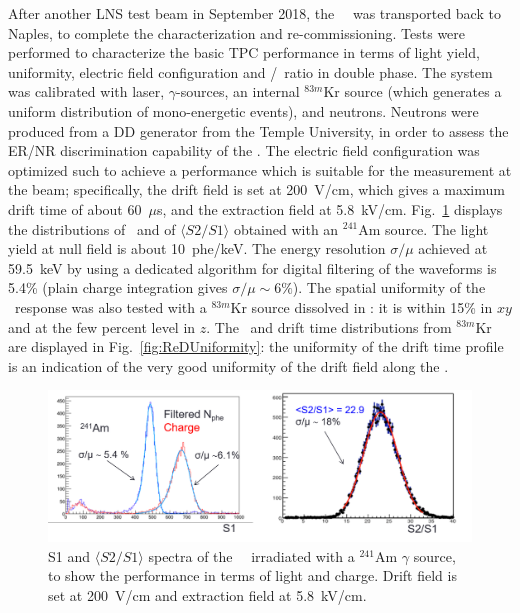 After another LNS test beam in September 2018, the \ReD\ \TPC\ was transported back to 
Naples, to complete the characterization and re-commissioning. Tests were
performed to characterize the basic TPC performance in terms of light yield, 
uniformity, electric field configuration and \STwo/\SOne\ ratio in double phase. The system was 
calibrated with laser, $\gamma$-sources, an internal $^{83m}$Kr source 
(which generates a uniform distribution of mono-energetic events), and neutrons. 
Neutrons were produced from a DD generator from the Temple University, in order to assess the 
ER/NR discrimination capability of the \TPC. 
The electric field configuration was optimized such to achieve a performance 
which is suitable for the measurement at the beam; specifically, the drift field is set 
at 200~V/cm, which gives a maximum drift time of about 60~$\mu$s, and the extraction 
field at 5.8~kV/cm. Fig.~\ref{fig:TPCperformance} displays the distributions of \SOne\ and 
of $\langle S2/S1 \rangle$ obtained with an $^{241}$Am source. The light yield at null 
field is about 10~phe/keV. The energy resolution $\sigma/\mu$ achieved at 59.5~keV by 
using a dedicated algorithm for digital filtering of the waveforms is 5.4\% (plain 
charge integration gives $\sigma/\mu \sim 6\%$). The spatial uniformity of the \TPC\ response 
was also tested with a $^{83m}$Kr source dissolved in \LAr: it is within 15\% in $xy$ and 
at the few percent level in $z$. The \SOne\ and drift time distributions from $^{83m}$Kr 
are displayed in Fig.~\ref{fig:ReDUniformity}: the uniformity of the drift time profile 
is an indication of the very good uniformity of the drift field along the \TPC. 
%
\begin{figure}[tbp!]
\centering
\includegraphics[width=0.95\columnwidth]{./Figures/TPCperformance.png}
\caption[\ReD\ \TPC\ performance]{S1 and $\langle S2/S1 \rangle$ spectra of the 
\ReD\ \TPC\ irradiated with a $^{241}$Am $\gamma$ source, to show the performance in terms of light 
and charge. Drift field is set at 200~V/cm and extraction field at 5.8~kV/cm.}
\label{fig:TPCperformance}
\end{figure}
